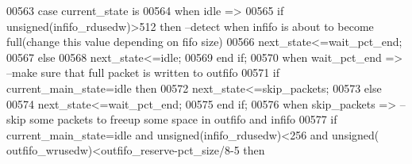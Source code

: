 \begin{DoxyCode}
00563     \textcolor{keywordflow}{case} \textcolor{vhdlchar}{current_state} \textcolor{keywordflow}{is}
00564         \textcolor{keywordflow}{when} \textcolor{vhdlchar}{idle} \textcolor{vhdlchar}{=}\textcolor{vhdlchar}{>}
00565             \textcolor{keywordflow}{if} \textcolor{comment}{unsigned}\textcolor{vhdlchar}{(}\textcolor{vhdlchar}{infifo_rdusedw}\textcolor{vhdlchar}{)}\textcolor{vhdlchar}{>}\textcolor{vhdllogic}{}\textcolor{vhdllogic}{512} \textcolor{keywordflow}{then}\textcolor{keyword}{ --detect when infifo is about to become full(change this
       value depending on fifo size)}
00566                 \textcolor{vhdlchar}{next_state}\textcolor{vhdlchar}{<=}\textcolor{vhdlchar}{wait\_pct\_end};
00567             \textcolor{keywordflow}{else} 
00568                 \textcolor{vhdlchar}{next_state}\textcolor{vhdlchar}{<=}\textcolor{vhdlchar}{idle};
00569             \textcolor{keywordflow}{end} \textcolor{keywordflow}{if};
00570         \textcolor{keywordflow}{when} \textcolor{vhdlchar}{wait\_pct\_end} \textcolor{vhdlchar}{=}\textcolor{vhdlchar}{>}\textcolor{keyword}{                      --make sure that full packet is written to outfifo}
00571             \textcolor{keywordflow}{if} \textcolor{vhdlchar}{current_main_state}\textcolor{vhdlchar}{=}\textcolor{vhdlchar}{idle} \textcolor{keywordflow}{then}     
00572                 \textcolor{vhdlchar}{next_state}\textcolor{vhdlchar}{<=}\textcolor{vhdlchar}{skip\_packets};
00573             \textcolor{keywordflow}{else} 
00574                 \textcolor{vhdlchar}{next_state}\textcolor{vhdlchar}{<=}\textcolor{vhdlchar}{wait\_pct\_end};
00575             \textcolor{keywordflow}{end} \textcolor{keywordflow}{if};
00576         \textcolor{keywordflow}{when} \textcolor{vhdlchar}{skip\_packets} \textcolor{vhdlchar}{=}\textcolor{vhdlchar}{>}\textcolor{keyword}{                                --skip some packets to freeup some space in
       outfifo and infifo }
00577             \textcolor{keywordflow}{if} \textcolor{vhdlchar}{current_main_state}\textcolor{vhdlchar}{=}\textcolor{vhdlchar}{idle} \textcolor{keywordflow}{and} \textcolor{comment}{unsigned}\textcolor{vhdlchar}{(}\textcolor{vhdlchar}{infifo_rdusedw}\textcolor{vhdlchar}{)}\textcolor{vhdlchar}{<}\textcolor{vhdllogic}{}\textcolor{vhdllogic}{256} \textcolor{keywordflow}{and} \textcolor{comment}{unsigned}\textcolor{vhdlchar}{(}\textcolor{vhdlchar}{
      outfifo_wrusedw}\textcolor{vhdlchar}{)}\textcolor{vhdlchar}{<}\textcolor{vhdlchar}{outfifo_reserve}\textcolor{vhdlchar}{-}\textcolor{vhdlchar}{pct_size}\textcolor{vhdlchar}{/}\textcolor{vhdllogic}{8-5} \textcolor{keywordflow}{then}

\end{DoxyCode}
